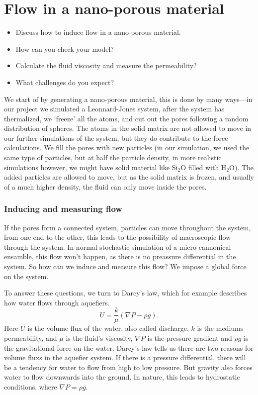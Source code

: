 \documentclass[a4paper, 11pt, notitlepage, english]{article}
\begin{document}
\clearpage


\section{Flow in a nano-porous material}
\begin{itemize}
	\item Discuss how to induce flow in a nano-porous material. 
	\item How can you check your model?
	\item Calculate the fluid viscosity and measure the permeability?
	\item What challenges do you expect?
\end{itemize}

We start of by generating a nano-porous material, this is done by many ways---in our project we simulated a Leonnard-Jones system, after the system has thermalized, we `freeze' all the atoms, and cut out the pores following a random distribution of spheres. The atoms in the solid matrix are not allowed to move in our further simulations of the system, but they do contribute to the force calculations. We fill the pores with new particles (in our simulation, we used the same type of particles, but at half the particle density, in more realistic simulations however, we might have solid material like Si$_2$O filled with H$_2$O). The added particles are allowed to move, but as the solid matrix is frozen, and usually of a much higher density, the fluid can only move inside the pores.

\subsubsection*{Inducing and measuring flow}

If the pores form a connected system, particles can move throughout the system, from one end to the other, this leads to the possibility of macroscopic flow through the system. In normal stochastic simulation of a micro-cannonical ensamble, this flow won't happen, as there is no preassure differential in the system. So how can we induce and measure this flow? We impose a global force on the system.

To answer these questions, we turn to Darcy's law, which for example describes how water flows through aquefiers.
$$U = \frac{k}{\mu}(\nabla P - \rho g).$$
Here $U$ is the volume flux of the water, also called discharge, $k$ is the mediums permeability, and $\mu$ is the fluid's viscosity, $\nabla P$ is the pressure gradient and $\rho g$ is the gravitational force on the water. Darcy's law tells us there are two reasons for volume fluxs in the aquefier system. If there is a pressure differential, there will be a tendency for water to flow from high to low pressure. But gravity also forces water to flow downwards into the ground. In nature, this leads to hydrostatic conditions, where $\nabla P = \rho g$.
\end{document}
